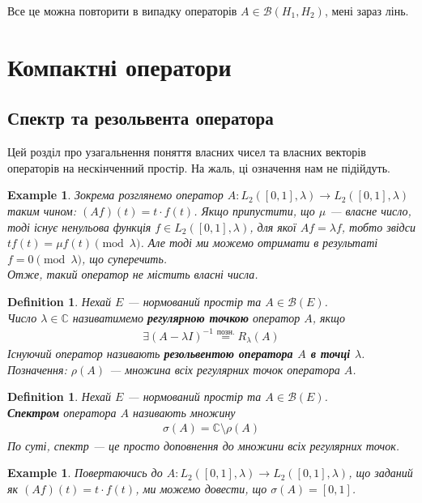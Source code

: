 \documentclass[a4paper, 10pt]{article}
\theoremstyle{theoremdd}
\theoremstyle{theoremdd}
\newtheorem{definition}[theorem]{Definition}
\theoremstyle{theoremdd}
\theoremstyle{theoremdd}
\newtheorem{example}[theorem]{Example}
\theoremstyle{theoremdd}
\theoremstyle{theoremdd}
\theoremstyle{theoremdd}
\theoremstyle{theoremdd}
\begin{document}
Все це можна повторити в випадку операторів $A \in \mathcal{B}(H_1,H_2)$, мені зараз лінь.
\newpage

\section{Компактні оператори}
\subsection{Спектр та резольвента оператора}
Цей розділ про узагальнення поняття власних чисел та власних векторів операторів на нескінченний простір. На жаль, ці означення нам не підійдуть.

\begin{example}
Зокрема розглянемо оператор $A \colon L_2([0,1],\lambda) \to L_2([0,1],\lambda)$ таким чином: $(Af)(t) = t \cdot f(t)$. Якщо припустити, що $\mu$ --- власне число, тоді існує ненульова функція $f \in L_2([0,1],\lambda)$, для якої $Af = \lambda f$, тобто звідси $t f(t) = \mu f(t) \pmod \lambda$. Але тоді ми можемо отримати в результаті $f = 0 \pmod \lambda$, що суперечить.\\
Отже, такий оператор не містить власні числа.
\end{example}

\begin{definition}
Нехай $E$ --- нормований простір та $A \in \mathcal{B}(E)$.\\
Число $\lambda \in \mathbb{C}$ називатимемо \textbf{регулярною точкою} оператор $A$, якщо
\begin{align*}
\exists (A-\lambda I)^{-1} \overset{\text{позн.}}{=} R_\lambda(A)
\end{align*}
Існуючий оператор називають \textbf{резольвентою оператора $A$ в точці $\lambda$}.\\ 
Позначення: $\rho(A)$ --- множина всіх регулярних точок оператора $A$.
\end{definition}

\begin{definition}
Нехай $E$ --- нормований простір та $A \in \mathcal{B}(E)$.\\
\textbf{Спектром} оператора $A$ називають множину
\begin{align*}
\sigma(A) = \mathbb{C} \setminus \rho(A)
\end{align*}
По суті, спектр --- це просто доповнення до множини всіх регулярних точок.
\end{definition}

\begin{example}
Повертаючись до $A \colon L_2([0,1],\lambda) \to L_2([0,1],\lambda)$, що заданий як $(Af)(t) = t \cdot f(t)$, ми можемо довести, що $\sigma(A) = [0,1]$.
\end{example}
\end{document}
